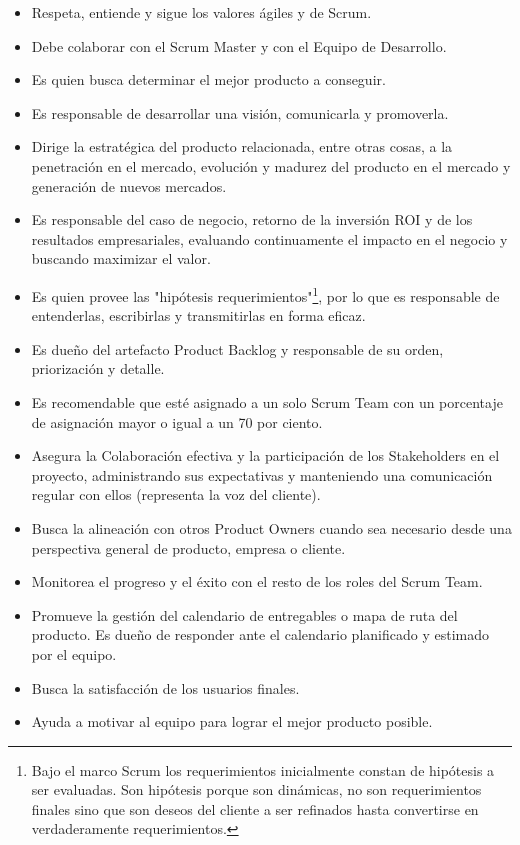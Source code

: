 \begin{itemize}
\item Respeta, entiende y sigue los valores ágiles y de Scrum.
\item Debe colaborar con el Scrum Master y con el Equipo de Desarrollo.
\item Es quien busca determinar el mejor producto a conseguir.
\item Es responsable de desarrollar una visión, comunicarla y promoverla.
\item Dirige la estratégica del producto relacionada, entre otras cosas, a la penetración en el mercado, evolución y madurez del producto en el mercado y generación de nuevos mercados.
\item Es responsable del caso de negocio, retorno de la inversión ROI y de los resultados empresariales, evaluando continuamente el impacto en el negocio y buscando maximizar el valor.
\item Es quien provee las "hipótesis requerimientos"\footnote{Bajo el marco Scrum los requerimientos inicialmente constan de hipótesis a ser evaluadas. Son hipótesis porque son dinámicas, no son requerimientos finales sino que son deseos del cliente a ser refinados hasta convertirse en verdaderamente requerimientos.}, por lo que es responsable de entenderlas, escribirlas y transmitirlas en forma eficaz.
\item Es dueño del artefacto Product Backlog y responsable de su orden, priorización y detalle.
\item Es recomendable que esté asignado a un solo Scrum Team con un porcentaje de asignación mayor o igual a un 70 por ciento.
\item Asegura la Colaboración efectiva y la participación de los Stakeholders en el proyecto, administrando sus expectativas y manteniendo una comunicación regular con ellos (representa la voz del cliente).
\item Busca la alineación con otros Product Owners cuando sea necesario desde una perspectiva general de producto, empresa o cliente.
\item Monitorea el progreso y el éxito con el resto de los roles del Scrum Team. 
\item Promueve la gestión del calendario de entregables o mapa de ruta del producto. Es dueño de responder ante el calendario planificado y estimado por el equipo.
\item Busca la satisfacción de los usuarios finales.
\item Ayuda a motivar al equipo para lograr el mejor producto posible.

\end{itemize}
